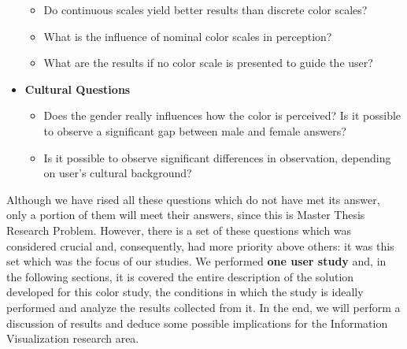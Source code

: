 \begin{itemize}
    \begin{itemize}
    	\setlength\itemsep{0.1em}
			\item Do continuous scales yield better results than discrete color scales?
      \item What is the influence of nominal color scales in perception?
      \item What are the results if no color scale is presented to guide the user?
		\end{itemize}
  \item \textbf{Cultural Questions}
    \begin{itemize}
    	\setlength\itemsep{0.01em}
			\item Does the gender really influences how the color is perceived? Is it possible to observe a significant gap between
			male and female answers?
			\item Is it possible to observe significant differences in observation, depending on user's cultural background?
		\end{itemize}
\end{itemize} \par
%
Although we have rised all these questions which do not have met its answer, only a portion of them will meet their answers,
since this is Master Thesis Research Problem. However, there is a set of these questions which was considered crucial and, consequently,
had more priority above others: it was this set which was the focus of our studies. We performed \textbf{one user study} and,
in the following sections, it is covered the entire description of the solution developed for this color study, the conditions in which
the study is ideally performed and analyze the results collected from it. In the end, we will perform a discussion of results and deduce
some possible implications for the Information Visualization research area.
%
